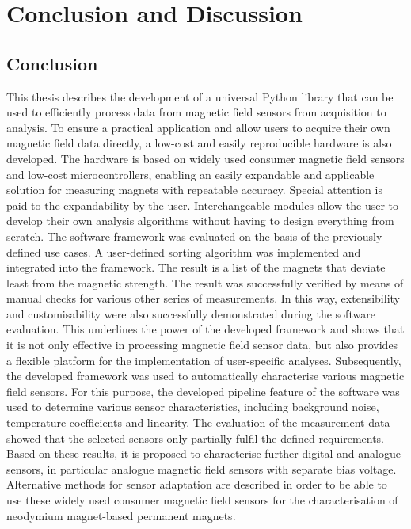 \hypertarget{conclusion-and-discussion}{%
\chapter{Conclusion and Discussion}\label{conclusion-and-discussion}}

\hypertarget{conclusion}{%
\section{Conclusion}\label{conclusion}}

This thesis describes the development of a universal Python library that
can be used to efficiently process data from magnetic field sensors from
acquisition to analysis. To ensure a practical application and allow
users to acquire their own magnetic field data directly, a low-cost and
easily reproducible hardware is also developed. The hardware is based on
widely used consumer magnetic field sensors and low-cost
microcontrollers, enabling an easily expandable and applicable solution
for measuring magnets with repeatable accuracy. Special attention is
paid to the expandability by the user. Interchangeable modules allow the
user to develop their own analysis algorithms without having to design
everything from scratch. The software framework was evaluated on the
basis of the previously defined use cases. A user-defined sorting
algorithm was implemented and integrated into the framework. The result
is a list of the magnets that deviate least from the magnetic strength.
The result was successfully verified by means of manual checks for
various other series of measurements. In this way, extensibility and
customisability were also successfully demonstrated during the software
evaluation. This underlines the power of the developed framework and
shows that it is not only effective in processing magnetic field sensor
data, but also provides a flexible platform for the implementation of
user-specific analyses. Subsequently, the developed framework was used
to automatically characterise various magnetic field sensors. For this
purpose, the developed pipeline feature of the software was used to
determine various sensor characteristics, including background noise,
temperature coefficients and linearity. The evaluation of the
measurement data showed that the selected sensors only partially fulfil
the defined requirements. Based on these results, it is proposed to
characterise further digital and analogue sensors, in particular
analogue magnetic field sensors with separate bias voltage. Alternative
methods for sensor adaptation are described in order to be able to use
these widely used consumer magnetic field sensors for the
characterisation of neodymium magnet-based permanent magnets.

